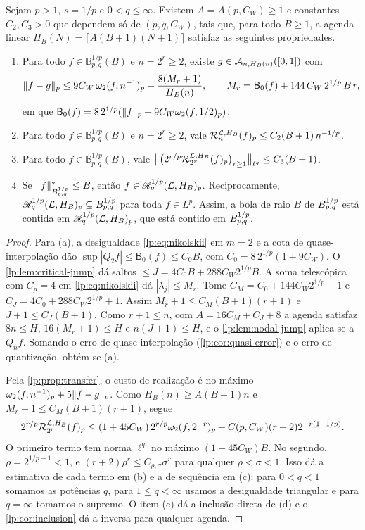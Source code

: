 \documentclass[12pt,a4paper]{article}
\begin{document}
\begin{teorema}[Altura linear crítica para $s=1/p$ com $p>1$]
\label{lp:thm:critical-linear}
Sejam $p>1$, $s=1/p$ e $0<q\le\infty$. Existem $A=A(p,C_W)\ge1$ e constantes $C_2,C_3>0$ que dependem só de $(p,q,C_W)$, tais que, para todo $B\ge1$, a agenda linear $H_B(N)=\lceil A(B+1)(N+1)\rceil$ satisfaz as seguintes propriedades.
\begin{enumerate}[label=(\alph*)]
 \item Para todo $f\in\mathbb B^{1/p}_{p,q}(B)$ e $n=2^r\ge2$, existe $g\in\mathcal A_{n,H_B(n)}([0,1])$ com
 \[
  \|f-g\|_p\le 9C_W\,\omega_2(f,n^{-1})_{p}+\frac{8(M_r+1)}{H_B(n)},\qquad M_r=\mathsf B_0(f)+144\,C_W\,2^{1/p}\,B\,r,
 \]
 em que $\mathsf B_0(f)=8\,2^{1/p}(\|f\|_p+9C_W\omega_2(f,1/2)_{p})$.
 \item Para todo $f\in\mathbb B^{1/p}_{p,q}(B)$ e $n=2^r\ge2$, vale $\mathcal R^{\mathcal L,H_B}_{n}(f)_p\le C_2(B+1)\,n^{-1/p}$.
 \item Para todo $f\in\mathbb B^{1/p}_{p,q}(B)$, vale $\big\|\big(2^{r/p}\mathcal R^{\mathcal L,H_B}_{2^r}(f)_p\big)_{r\ge1}\big\|_{\ell^q}\le C_3(B+1)$.
 \item Se $\|f\|^*_{B^{1/p}_{p,q}}\le B$, então $f\in\mathscr R^{1/p}_{q}(\mathcal L,H_B)_p$. Reciprocamente, $\mathscr R^{1/p}_{q}(\mathcal L,H_B)_p\subseteq B^{1/p}_{p,q}$ para toda $f\in L^p$. Assim, a bola de raio $B$ de $B^{1/p}_{p,q}$ está contida em $\mathscr R^{1/p}_{q}(\mathcal L,H_B)_p$, que está contido em $B^{1/p}_{p,q}$.
\end{enumerate}
\end{teorema}

\begin{proof}
Para (a), a desigualdade \eqref{lp:eq:nikolskii} em $m=2$ e a cota de quase-interpolação dão $\sup|Q_2f|\le\mathsf B_0(f)\le C_0B$, com $C_0=8\,2^{1/p}(1+9C_W)$. O \cref{lp:lem:critical-jump} dá saltos $\le J=4C_0B+288C_W2^{1/p}B$. A soma telescópica com $C_p=4$ em \eqref{lp:eq:nikolskii} dá $|\lambda_j|\le M_r$. Tome $C_M=C_0+144C_W2^{1/p}+1$ e $C_J=4C_0+288C_W2^{1/p}+1$. Assim $M_r+1\le C_M(B+1)(r+1)$ e $J+1\le C_J(B+1)$. Como $r+1\le n$, com $A=16C_M+C_J+8$ a agenda satisfaz $8n\le H$, $16(M_r+1)\le H$ e $n(J+1)\le H$, e o \cref{lp:lem:nodal-jump} aplica-se a $Q_nf$. Somando o erro de quase-interpolação (\cref{lp:cor:quasi-error}) e o erro de quantização, obtém-se (a).

Pela \cref{lp:prop:transfer}, o custo de realização é no máximo $\omega_2(f,n^{-1})_{p}+5\|f-g\|_p$. Como $H_B(n)\ge A(B+1)n$ e $M_r+1\le C_M(B+1)(r+1)$, segue
\[
 2^{r/p}\mathcal R^{\mathcal L,H_B}_{2^r}(f)_p
 \le(1+45C_W)\,2^{r/p}\omega_2(f,2^{-r})_{p}
    +C(p,C_W)(r+2)2^{-r(1-1/p)}.
\]
O primeiro termo tem norma $\ell^q$ no máximo $(1+45C_W)B$. No segundo, $\rho=2^{1/p-1}<1$, e $(r+2)\rho^r\le C_{\rho,\sigma}\sigma^r$ para qualquer $\rho<\sigma<1$. Isso dá a estimativa de cada termo em (b) e a de sequência em (c): para $0<q<1$ somamos as potências $q$, para $1\le q<\infty$ usamos a desigualdade triangular e para $q=\infty$ tomamos o supremo. O item (c) dá a inclusão direta de (d) e o \cref{lp:cor:inclusion} dá a inversa para qualquer agenda.
\end{proof}
\end{document}
